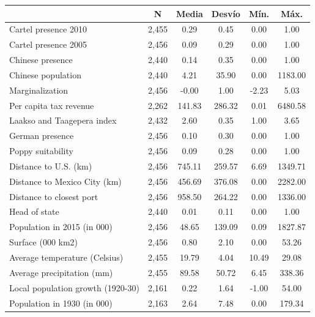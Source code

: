 {
\def\sym#1{\ifmmode^{#1}\else\(^{#1}\)\fi}
\begin{tabular}{l*{1}{ccccc}}
\toprule
                    &           N&       Media&      Desvío&        Mín.&        Máx.\\
\midrule
Cartel presence 2010&       2,455&        0.29&        0.45&        0.00&        1.00\\
Cartel presence 2005&       2,456&        0.09&        0.29&        0.00&        1.00\\
Chinese presence    &       2,440&        0.14&        0.35&        0.00&        1.00\\
Chinese population  &       2,440&        4.21&       35.90&        0.00&     1183.00\\
Marginalization     &       2,456&       -0.00&        1.00&       -2.23&        5.03\\
Per capita tax revenue&       2,262&      141.83&      286.32&        0.01&     6480.58\\
Laakso and Taagepera index&       2,432&        2.60&        0.35&        1.00&        3.65\\
German presence     &       2,456&        0.10&        0.30&        0.00&        1.00\\
Poppy suitability   &       2,456&        0.09&        0.28&        0.00&        1.00\\
Distance to U.S. (km)&       2,456&      745.11&      259.57&        6.69&     1349.71\\
Distance to Mexico City (km)&       2,456&      456.69&      376.08&        0.00&     2282.00\\
Distance to closest port&       2,456&      958.50&      264.22&        0.00&     1336.00\\
Head of state       &       2,440&        0.01&        0.11&        0.00&        1.00\\
Population in 2015 (in 000)&       2,456&       48.65&      139.09&        0.09&     1827.87\\
Surface (000 km2)   &       2,456&        0.80&        2.10&        0.00&       53.26\\
Average temperature (Celsius)&       2,455&       19.79&        4.04&       10.49&       29.08\\
Average precipitation (mm)&       2,455&       89.58&       50.72&        6.45&      338.36\\
Local population growth (1920-30)&       2,161&        0.22&        1.64&       -1.00&       54.00\\
Population in 1930 (in 000)&       2,163&        2.64&        7.48&        0.00&      179.34\\
\bottomrule
\end{tabular}
}

